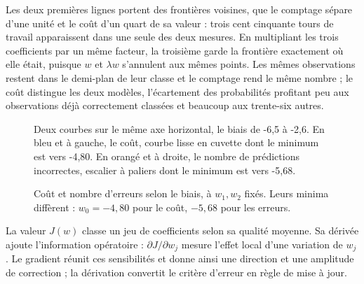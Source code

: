 Les deux premières lignes portent des frontières voisines, que le comptage sépare
d'une unité et le coût d'un quart de sa valeur : trois cent cinquante tours de
travail apparaissent dans une seule des deux mesures. En multipliant les trois
coefficients par un même facteur, la troisième garde la frontière exactement où
elle était, puisque $w$ et $\lambda w$ s'annulent aux mêmes points. Les mêmes
observations restent dans le demi-plan de leur classe et le comptage rend le
même nombre ; le coût
distingue les deux modèles, l'écartement des probabilités profitant peu aux
observations déjà correctement classées et beaucoup aux trente-six autres.

\begin{figure}[htbp]
\centering
\begin{graphique}{Deux courbes sur le même axe horizontal, le biais de -6,5 à -2,6. En bleu et à gauche, le coût, courbe lisse en cuvette dont le minimum est vers -4,80. En orangé et à droite, le nombre de prédictions incorrectes, escalier à paliers dont le minimum est vers -5,68.}
\end{graphique}
\caption{Coût et nombre d'erreurs selon le biais, à $w_1,w_2$ fixés. Leurs
minima diffèrent : $w_0=-4{,}80$ pour le coût, $-5{,}68$ pour les erreurs.}
\label{fig:deux-mesures}
\end{figure}
\FloatBarrier

La valeur $J(w)$ classe un jeu de coefficients selon sa qualité moyenne. Sa
dérivée ajoute l'information opératoire : $\partial J/\partial w_j$ mesure
l'effet local d'une variation de $w_j$. Le gradient réunit ces sensibilités et
donne ainsi une direction et une amplitude de correction ; la dérivation
convertit le critère d'erreur en règle de mise à jour.
